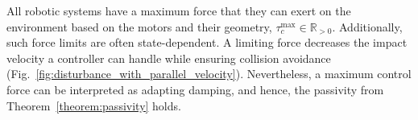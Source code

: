 All robotic systems have a maximum force that they can exert on the environment based on the motors and their geometry, $\tau_c^{\mathrm{max}} \in \mathbb{R}_{>0}$. Additionally, such force limits are often state-dependent. A limiting force decreases the impact velocity a controller can handle while ensuring collision avoidance (Fig.~\ref{fig:disturbance_with_parallel_velocity}). Nevertheless, a maximum control force can be interpreted as adapting damping, and hence, the passivity from Theorem~\ref{theorem:passivity} holds.


